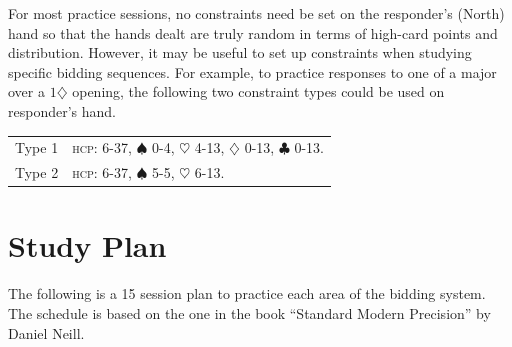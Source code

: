 \documentclass[a4paper,article,oneside]{memoir}
\newcommand{\hcp}{\textsc{hcp}}
\begin{document}
For most practice sessions, no constraints need be set on the
responder's (North) hand so that the hands dealt are truly random in
terms of high-card points and distribution. However, it may be useful
to set up constraints when studying specific bidding sequences. For
example, to practice responses to one of a major over a
$1\diamondsuit$ opening, the following two constraint types could be
used on responder's hand.

\begin{longtable}{l|p{10cm}}
  \hline
  Type 1 & \hcp: 6-37,
           $\spadesuit$ 0-4,
           $\heartsuit$ 4-13,
           $\diamondsuit$ 0-13,
           $\clubsuit$ 0-13. \\
  Type 2 & \hcp: 6-37,
           $\spadesuit$ 5-5,
           $\heartsuit$ 6-13. \\
  \hline
\end{longtable}

\section{Study Plan}

The following is a 15 session plan to practice each area of the bidding system. The schedule is based on the one in the book 
``Standard Modern Precision'' by Daniel Neill.
\end{document}

